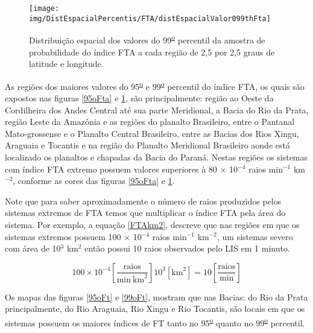 \begin{figure}[!ht]
\centering  
{\texttt{[image: img/DistEspacialPercentis/FTA/distEspacialValor099thFta]}}
\caption{Distribuição espacial dos valores do  99\textsuperscript{\underline{o}} percentil da amostra de probabilidade do índice FTA a cada região de 2,5 por 2,5 graus de latitude e longitude.}
\label{99oFta}
\end{figure} 

As regiões dos maiores valores do 95\textsuperscript{\underline{o}} e 99\textsuperscript{\underline{o}} percentil do índice FTA, os quais são expostos nas figuras \ref{95oFta} e \ref{99oFta}, são principalmente:  região ao Oeste da Cordilheira dos Andes Central até sua parte Meridional, a Bacia do Rio da Prata, região Leste da Amazônia e as regiões do planalto Brasileiro, entre o Pantanal Mato-grossense e o Planalto Central Brasileiro, entre as Bacias dos Rios Xingu, Araguaia e Tocantis e na região do Planalto Meridional Brasileiro aonde está localizado os planaltos e chapadas da Bacia do Paraná. Nestas regiões os sistemas com índice FTA extremo possuem valores superiores à 80 $\times$ 10$^{-4}$ raios min$^{-1}$ km$^{-2}$, conforme as cores das figuras \ref{95oFta} e \ref{99oFta}. 


Note que para saber aproximadamente o número de raios produzidos pelos sistemas extremos de FTA temos que multiplicar o índice FTA pela área do sistema. Por exemplo, a equação \ref{FTAkm2}, descreve que nas regiões em que os sistemas extremos possuem 100 $\times$ 10$^{-4}$ raios min$^{-1}$ km$^{-2}$, um sistemas severo com área de 10$^3$ km$^2$ então possui 10 raios observados pelo LIS em 1 minuto.  

\begin{equation}
100 \times 10^{-4} \left[ \frac{\mathrm{raios}}{\mathrm{min}~\mathrm{km}^2} \right]  10^3 [ \mathrm{km}^2 ] = 10 \left[ \frac{\mathrm{raios}}{\mathrm{min}}\right]  
\label{FTAkm2}
\end{equation}

Os mapas das figuras \ref{95oFt} e \ref{99oFt}, mostram que nas Bacias: do Rio da Prata principalmente, do Rio Araguaia, Rio Xingu e Rio Tocantis, são locais em que os sistemas possuem os maiores índices de FT tanto no 95\textsuperscript{\underline{o}} quanto no 99\textsuperscript{\underline{o}} percentil.

